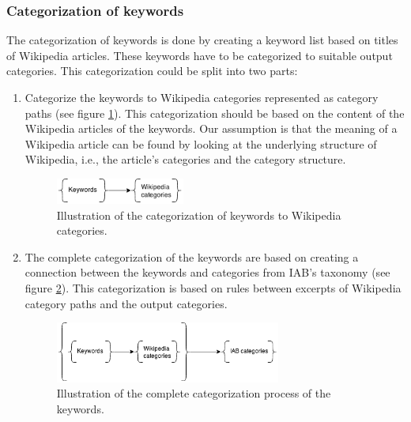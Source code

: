 
\subsubsection{Categorization of keywords}
The categorization of keywords is done by creating a keyword list based on titles of Wikipedia articles. These keywords have to be categorized to suitable output categories. This categorization could be split into two parts: 

\begin{enumerate}
\item Categorize the keywords to Wikipedia categories represented as category paths  (see figure \ref{fig:keywords_to_categories}). This categorization should be based on the content of the Wikipedia articles of the keywords. Our assumption is that the meaning of a Wikipedia article can be found by looking at the underlying structure of Wikipedia, i.e., the article's categories and the category structure.\begin{figure}[h]
\centering
\includegraphics[width=0.4\textwidth]{Chapters/Background/Keywords_to_categories}
\caption[Categorization of keywords to Wikipedia categories]{Illustration of the categorization of keywords to Wikipedia categories.}
\label{fig:keywords_to_categories}
\end{figure}
\item The complete categorization of the keywords are based on creating a connection between the keywords and categories from IAB's taxonomy (see figure \ref{fig:keywords_categorization_full}). This categorization is based on rules between excerpts of Wikipedia category paths and the output categories. 
\begin{figure}[h]
\centering
\includegraphics[width=0.7\textwidth]{Chapters/Background/Keywords_categorization_full}
\caption[Categorzation process of the keywords]{Illustration of the complete categorization process of the keywords.}
\label{fig:keywords_categorization_full}
\end{figure}
\end{enumerate}

